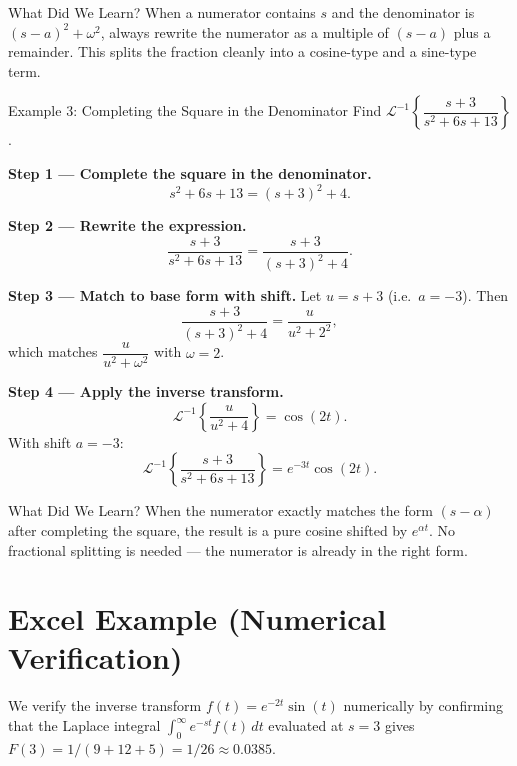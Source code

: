 \documentclass[12pt,a4paper]{article}
\begin{document}
\begin{learnbox}{What Did We Learn?}
When a numerator contains $s$ and the denominator is $(s-a)^2+\omega^2$,
always rewrite the numerator as a multiple of $(s-a)$ plus a remainder.
This splits the fraction cleanly into a cosine-type and a sine-type term.
\end{learnbox}

\begin{infobox}{Example 3: Completing the Square in the Denominator}
Find $\mathcal{L}^{-1}\!\left\{\dfrac{s+3}{s^2+6s+13}\right\}$.

\textbf{Step 1 --- Complete the square in the denominator.}
\[
  s^2+6s+13 = (s+3)^2 + 4.
\]

\textbf{Step 2 --- Rewrite the expression.}
\[
  \frac{s+3}{s^2+6s+13} = \frac{s+3}{(s+3)^2+4}.
\]

\textbf{Step 3 --- Match to base form with shift.}
Let $u = s+3$ (i.e.~$a=-3$). Then
\[
  \frac{s+3}{(s+3)^2+4} = \frac{u}{u^2+2^2},
\]
which matches $\dfrac{u}{u^2+\omega^2}$ with $\omega=2$.

\textbf{Step 4 --- Apply the inverse transform.}
\[
  \mathcal{L}^{-1}\!\left\{\frac{u}{u^2+4}\right\} = \cos(2t).
\]
With shift $a=-3$:
\[
  \mathcal{L}^{-1}\!\left\{\frac{s+3}{s^2+6s+13}\right\}
  = e^{-3t}\cos(2t).
\]
\end{infobox}

\begin{learnbox}{What Did We Learn?}
When the numerator exactly matches the form $(s-\alpha)$ after completing
the square, the result is a pure cosine shifted by $e^{\alpha t}$. No
fractional splitting is needed --- the numerator is already in the right form.
\end{learnbox}

\section{Excel Example (Numerical Verification)}

We verify the inverse transform $f(t) = e^{-2t}\sin(t)$ numerically by
confirming that the Laplace integral $\int_0^\infty e^{-st} f(t)\,dt$
evaluated at $s = 3$ gives $F(3) = 1/(9+12+5) = 1/26 \approx 0.0385$.
\end{document}
